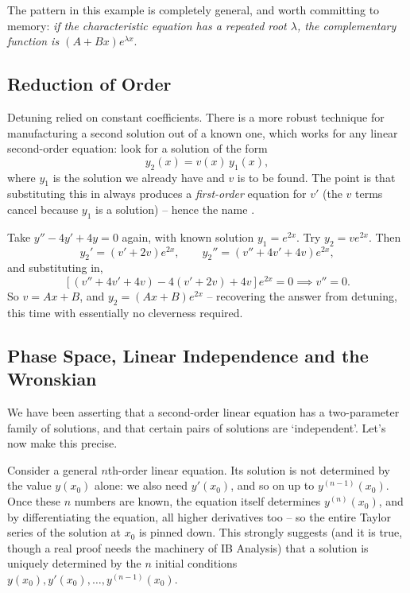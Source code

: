 \documentclass[a4paper]{scrartcl}
\begin{document}
The pattern in this example is completely general, and worth committing to memory: \emph{if the characteristic equation has a repeated root $\lambda$, the complementary function is $(A + Bx)e^{\lambda x}$}.

\subsection{Reduction of Order}

Detuning relied on constant coefficients. There is a more robust technique for manufacturing a second solution out of a known one, which works for any linear second-order equation: look for a solution of the form
$$
y_2(x) = v(x) \, y_1(x),
$$
where $y_1$ is the solution we already have and $v$ is to be found. The point is that substituting this in always produces a \emph{first-order} equation for $v'$ (the $v$ terms cancel because $y_1$ is a solution) -- hence the name .

\begin{example}
	Take $y'' - 4y' + 4y = 0$ again, with known solution $y_1 = e^{2x}$. Try $y_2 = v e^{2x}$. Then
	$$
	y_2' = (v' + 2v)e^{2x}, \qquad y_2'' = (v'' + 4v' + 4v)e^{2x},
	$$
	and substituting in,
	$$
	\left[(v'' + 4v' + 4v) - 4(v' + 2v) + 4v\right]e^{2x} = 0 \implies v'' = 0.
	$$
	So $v = Ax + B$, and $y_2 = (Ax + B)e^{2x}$ -- recovering the answer from detuning, this time with essentially no cleverness required.
\end{example}

\subsection{Phase Space, Linear Independence and the Wronskian}\label{sec:phase-space}

We have been asserting that a second-order linear equation has a two-parameter family of solutions, and that certain pairs of solutions are `independent'. Let's now make this precise.

Consider a general $n$th-order linear equation. Its solution is not determined by the value $y(x_0)$ alone: we also need $y'(x_0)$, and so on up to $y^{(n-1)}(x_0)$. Once these $n$ numbers are known, the equation itself determines $y^{(n)}(x_0)$, and by differentiating the equation, all higher derivatives too -- so the entire Taylor series of the solution at $x_0$ is pinned down. This strongly suggests (and it is true, though a real proof needs the machinery of IB Analysis) that a solution is uniquely determined by the $n$ initial conditions $y(x_0), y'(x_0), \dots, y^{(n-1)}(x_0)$.
\end{document}
